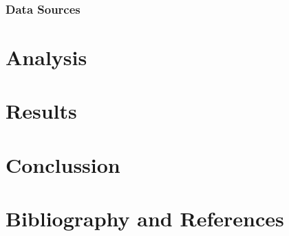 \documentclass[11pt]{article}
\begin{document}
\subsubsection{Data Sources}


\section{Analysis} \label{sec:analysis}

\section{Results} \label{sec:results}

\section{Conclussion} \label{sec:conclussion}

\section{Bibliography and References} \label{sec:bibliography}

{}
\end{document}
